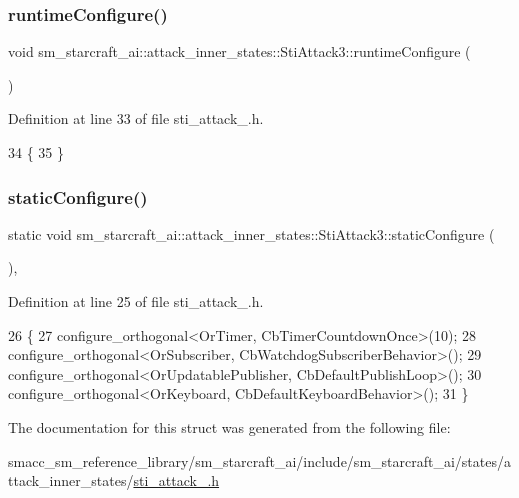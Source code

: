 \subsubsection{\texorpdfstring{runtime\+Configure()}{runtimeConfigure()}}
{\footnotesize\ttfamily void sm\+\_\+starcraft\+\_\+ai\+::attack\+\_\+inner\+\_\+states\+::\+Sti\+Attack3\+::runtime\+Configure (\begin{DoxyParamCaption}{ }\end{DoxyParamCaption})\hspace{0.3cm}{\ttfamily [inline]}}



Definition at line 33 of file sti\+\_\+attack\+\_.\+h.


\begin{DoxyCode}
34   \{
35   \}
\end{DoxyCode}
\mbox{\label{structsm__starcraft__ai_1_1attack__inner__states_1_1StiAttack3_a95e932b70e9a8de911ab0d6f74b567a5}} 
\subsubsection{\texorpdfstring{static\+Configure()}{staticConfigure()}}
{\footnotesize\ttfamily static void sm\+\_\+starcraft\+\_\+ai\+::attack\+\_\+inner\+\_\+states\+::\+Sti\+Attack3\+::static\+Configure (\begin{DoxyParamCaption}{ }\end{DoxyParamCaption})\hspace{0.3cm}{\ttfamily [inline]}, {\ttfamily [static]}}



Definition at line 25 of file sti\+\_\+attack\+\_.\+h.


\begin{DoxyCode}
26   \{
27     configure\_orthogonal<OrTimer, CbTimerCountdownOnce>(10);
28     configure\_orthogonal<OrSubscriber, CbWatchdogSubscriberBehavior>();
29     configure\_orthogonal<OrUpdatablePublisher, CbDefaultPublishLoop>();
30     configure\_orthogonal<OrKeyboard, CbDefaultKeyboardBehavior>();
31   \}
\end{DoxyCode}


The documentation for this struct was generated from the following file\+:\begin{DoxyCompactItemize}
\item 
smacc\+\_\+sm\+\_\+reference\+\_\+library/sm\+\_\+starcraft\+\_\+ai/include/sm\+\_\+starcraft\+\_\+ai/states/attack\+\_\+inner\+\_\+states/\hyperlink{sti__attack__3_8h}{sti\+\_\+attack\+\_.\+h}\end{DoxyCompactItemize}
